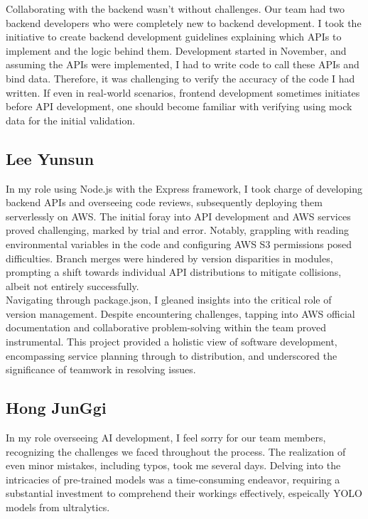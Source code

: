 \documentclass[conference]{IEEEtran}
\begin{document}
Collaborating with the backend wasn't without challenges. Our team had two backend developers who were completely new to backend development. I took the initiative to create backend development guidelines explaining which APIs to implement and the logic behind them. Development started in November, and assuming the APIs were implemented, I had to write code to call these APIs and bind data. Therefore, it was challenging to verify the accuracy of the code I had written. If even in real-world scenarios, frontend development sometimes initiates before API development, one should become familiar with verifying using mock data for the initial validation.\\

\subsection{Lee Yunsun}
In my role using Node.js with the Express framework, I took charge of developing backend APIs and overseeing code reviews, subsequently deploying them serverlessly on AWS. The initial foray into API development and AWS services proved challenging, marked by trial and error. Notably, grappling with reading environmental variables in the code and configuring AWS S3 permissions posed difficulties. Branch merges were hindered by version disparities in modules, prompting a shift towards individual API distributions to mitigate collisions, albeit not entirely successfully.\\ 

Navigating through package.json, I gleaned insights into the critical role of version management. Despite encountering challenges, tapping into AWS official documentation and collaborative problem-solving within the team proved instrumental. This project provided a holistic view of software development, encompassing service planning through to distribution, and underscored the significance of teamwork in resolving issues.\\

\subsection{Hong JunGgi}
In my role overseeing AI development, I feel sorry for our team members, recognizing the challenges we faced throughout the process. The realization of even minor mistakes, including typos, took me several days. Delving into the intricacies of pre-trained models was a time-consuming endeavor, requiring a substantial investment to comprehend their workings effectively, espeically YOLO models from ultralytics.\\
\end{document}
